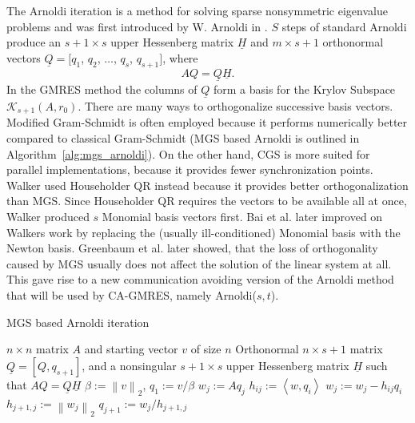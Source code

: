 \documentclass{scrartcl}
\numberwithin{equation}{section}
\newcommand{\norm}[1]{\left\lVert#1\right\rVert}
\begin{document}
The Arnoldi iteration is a method for solving sparse nonsymmetric eigenvalue problems and was first introduced by W. Arnoldi in \cite{arnoldi:hal-01712943}. $S$ steps of standard Arnoldi produce an $s + 1 \times s$ upper Hessenberg matrix $\underline{H}$ and $m \times s + 1$ orthonormal vectors $\underline{Q} = [q_1$, $q_2$, $\ldots$, $q_s$, $q_{s + 1}]$, where 
\begin{equation} \label{eq:AQ=QH}
	AQ = \underline{Q} \underline{H}.
\end{equation}
In the GMRES method the columns of $\underline{Q}$ form a basis for the Krylov Subspace $\mathcal{K}_{s + 1}(A, r_0)$. There are many ways to orthogonalize successive basis vectors. Modified Gram-Schmidt is often employed because it performs numerically better compared to classical Gram-Schmidt (MGS based Arnoldi is outlined in Algorithm~\ref{alg:mgs_arnoldi}). On the other hand, CGS is more suited for parallel implementations, because it provides fewer synchronization points.
Walker \cite{doi:10.1137/Walker} used Householder QR instead because it provides better orthogonalization than MGS. Since Householder QR requires the vectors to be available all at once, Walker produced $s$ Monomial basis vectors first. Bai et al. \cite{doi:10.1093/imanum/NewtonGMRES_bai} later improved on Walkers work by replacing the (usually ill-conditioned) Monomial basis with the Newton basis. Greenbaum et al. \cite{Greenbaum97numericalbehaviour} later showed, that the loss of orthogonality caused by MGS usually does not affect the solution of the linear system at all. This gave rise to a new communication avoiding version of the Arnoldi method that will be used by CA-GMRES, namely Arnoldi($s,t$).

\begin{algorithm}[H]
\caption{MGS based Arnoldi iteration}
\label{alg:mgs_arnoldi}
\begin{algorithmic}[1]
    \REQUIRE $n \times n$ matrix $A$ and  starting vector $v$ of size $n$
	\ENSURE Orthonormal $n \times s + 1$ matrix $\underline{Q} = [Q,q_{s + 1}]$, and a nonsingular $s + 1 \times s$ upper Hessenberg matrix $\underline{H}$ such that $AQ = \underline{Q} \underline{H}$
    \STATE $\beta := \norm{v}_2$, $q_1 := v/\beta$ 
		\STATE $w_j := Aq_j$
			\STATE $h_{ij} :=  \left< w, q_i \right>$
			\STATE $w_j := w_j - h_{ij}q_i$
		\ENDFOR
		\STATE $h_{j + 1, j} := \norm{w_j}_2$
		\STATE $q_{j + 1} := w_j / h_{j + 1, j}$
	\ENDFOR
\end{algorithmic}
\end{algorithm}
\end{document}
